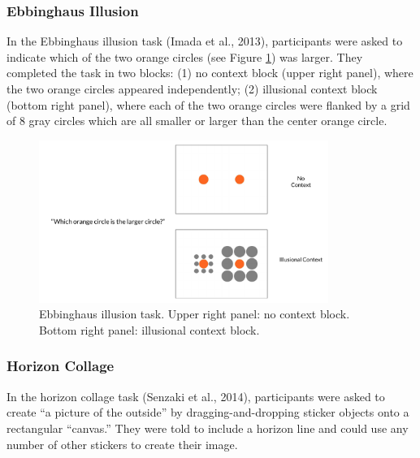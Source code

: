 \documentclass[
  man,floatsintext]{apa6}
\begin{document}
\hypertarget{ebbinghaus-illusion-2}{%
\subsubsection{Ebbinghaus Illusion}\label{ebbinghaus-illusion-2}}

In the Ebbinghaus illusion task (Imada et al., 2013), participants were asked to indicate which of the two orange circles (see Figure \ref{fig:ebbinghaus}) was larger. They completed the task in two blocks: (1) no context block (upper right panel), where the two orange circles appeared independently; (2) illusional context block (bottom right panel), where each of the two orange circles were flanked by a grid of 8 gray circles which are all smaller or larger than the center orange circle.

\begin{figure}[!h]

{\centering \includegraphics[width=1\linewidth,height=200px]{CCRR_manuscript_files/appendix_task_examples/e1_ebbinghaus} 

}

\caption{Ebbinghaus illusion task. Upper right panel: no context block. Bottom right panel: illusional context block.}\label{fig:ebbinghaus}
\end{figure}

\hypertarget{horizon-collage-3}{%
\subsubsection{Horizon Collage}\label{horizon-collage-3}}

In the horizon collage task (Senzaki et al., 2014), participants were asked to create ``a picture of the outside'' by dragging-and-dropping sticker objects onto a rectangular ``canvas.'' They were told to include a horizon line and could use any number of other stickers to create their image.
\end{document}
